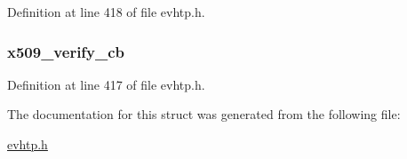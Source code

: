 Definition at line 418 of file evhtp.h.

\hypertarget{structevhtp__ssl__cfg__s_afcc514daa3570553ab171826205601c6}{
\subsubsection[{x509\_\-verify\_\-cb}]{ {\bf x509\_\-verify\_\-cb}}}
\label{structevhtp__ssl__cfg__s_afcc514daa3570553ab171826205601c6}


Definition at line 417 of file evhtp.h.



The documentation for this struct was generated from the following file:\begin{DoxyCompactItemize}
\item 
\hyperlink{evhtp_8h}{evhtp.h}\end{DoxyCompactItemize}
